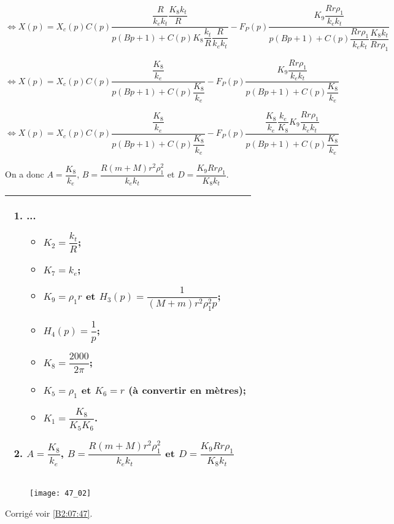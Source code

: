 $\Leftrightarrow X(p)
=
X_c(p) C(p)\dfrac{
\dfrac{R}{k_ek_t}\dfrac{K_8k_t}{R}}{
p\left(B p +  1\right) 
 + C(p)K_8 \dfrac{k_t}{R} \dfrac{R}{k_ek_t}
 }
- F_P(p)\dfrac{K_9\dfrac{Rr\rho_1}{  k_ek_t}}{
p\left(
B  p
 + 1\right)
 + C(p)\dfrac{Rr\rho_1}{  k_ek_t}\dfrac{ K_8 k_t}{Rr\rho_1 } }
$

$\Leftrightarrow X(p)
=
X_c(p) C(p)\dfrac{
\dfrac{K_8}{k_e}}{
p\left(B p +  1\right) 
 + C(p) \dfrac{K_8 }{k_e}
 }
- F_P(p)\dfrac{K_9\dfrac{Rr\rho_1}{  k_ek_t}}{
p\left(
B  p
 + 1\right)
 + C(p)\dfrac{K_8}{  k_e} }
$



$\Leftrightarrow X(p)
=
X_c(p) C(p)\dfrac{
\dfrac{K_8}{k_e}}{
p\left(B p +  1\right) 
 + C(p) \dfrac{K_8 }{k_e}
 }
- F_P(p)\dfrac{ \dfrac{K_8}{  k_e} \dfrac{  k_e}{K_8}K_9\dfrac{Rr\rho_1}{  k_ek_t}}{
p\left(
B  p
 + 1\right)
 + C(p)\dfrac{K_8}{  k_e} }
$



On a donc $A=\dfrac{K_8}{k_e}$, $B=\dfrac{R\left(m+M\right)r^2\rho_1^2}{k_ek_t}$ et 
$D = \dfrac{ K_9 Rr\rho_1}{  K_8k_t}$.
\else
\fi

\ifprof
\else
\ifcolle
\else
\footnotesize
\noindent
\begin{tabular}{|p{.8\linewidth}|}
\hline
\begin{enumerate}
\item ...
\begin{itemize}
\item $K_2 = \dfrac{k_t}{R}$;
\item $K_7 = k_e$;
\item $K_9 = \rho_1 r$ et $H_3(p)=\dfrac{1}{\left(M+m\right)r^2\rho_1^2 p}$;
\item $H_4(p)=\dfrac{1}{p}$; 
\item $K_8  = \dfrac{2000}{2\pi}$;
\item $K_5=\rho_1$ et $K_6=r$ (à convertir en mètres);
\item $K_1 =\dfrac{K_8}{K_5 K_6}$.
\end{itemize}
\item $A=\dfrac{K_8}{k_e}$, $B=\dfrac{R\left(m+M\right)r^2\rho_1^2}{k_ek_t}$ et 
$D = \dfrac{ K_9 Rr\rho_1}{  K_8k_t}$
\end{enumerate} \\ \hline
\end{tabular}
\normalsize
\fi
\begin{figure}[H]
\centering
\texttt{[image: 47\_02]}
\end{figure}
\fi







\ifprof
\else
\begin{flushright}
\footnotesize{Corrigé  voir \ref{B2:07:47}.}
\end{flushright}%
\fi